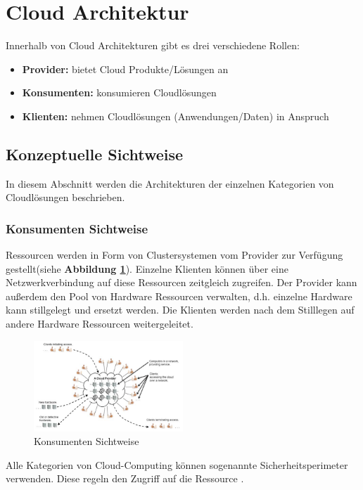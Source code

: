 \section{Cloud Architektur}

Innerhalb von Cloud Architekturen gibt es drei verschiedene Rollen:
\begin{itemize}
	\item \textbf{Provider:} bietet Cloud Produkte/Lösungen an
	\item \textbf{Konsumenten:} konsumieren Cloudlösungen
	\item \textbf{Klienten:} nehmen Cloudlösungen (Anwendungen/Daten) in Anspruch
\end{itemize}

\subsection{Konzeptuelle Sichtweise}

In diesem Abschnitt werden die Architekturen der einzelnen Kategorien von Cloudlösungen beschrieben.

\subsubsection{Konsumenten Sichtweise}
Ressourcen werden in Form von Clustersystemen vom Provider zur Verfügung gestellt(siehe \textbf{Abbildung \ref{ConsumerView}}).
Einzelne Klienten können über eine Netzwerkverbindung auf diese Ressourcen zeitgleich zugreifen. Der Provider kann außerdem den Pool
von Hardware Ressourcen verwalten, d.h. einzelne Hardware kann stillgelegt und ersetzt werden. Die Klienten werden nach dem Stilllegen
auf andere Hardware Ressourcen weitergeleitet.
\begin{figure}[h]
    \centering
	\includegraphics[width=0.5\textwidth]{Images/ConsumerView}
	\caption{Konsumenten Sichtweise \cite{Badger}}
	\label{ConsumerView}
\end{figure}
Alle Kategorien von Cloud-Computing können sogenannte Sicherheitsperimeter verwenden. Diese regeln den Zugriff auf die Ressource \cite{Badger}.

